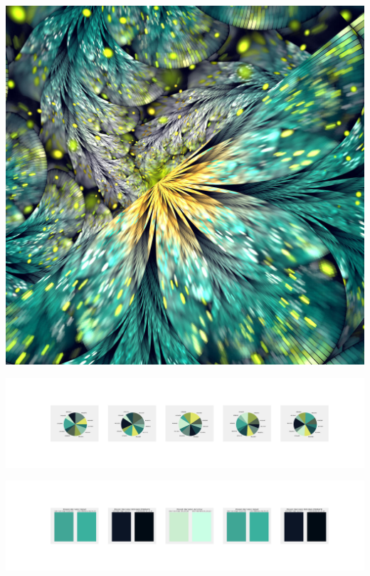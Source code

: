 \documentclass[11pt]{article}
\begin{document}
\begin{landscape}
    \begin{center}
    \includegraphics[width=\textwidth]{./nbimg/file (287).jpg}
    \end{center}

    \begin{center}
    \includegraphics[width=250mm]{./nbimg/pie-208.jpg}
    \end{center}

    \begin{center}
    \includegraphics[width=250mm]{./nbimg/peak-208.jpg}
    \end{center}
    


\end{landscape}
\end{document}
